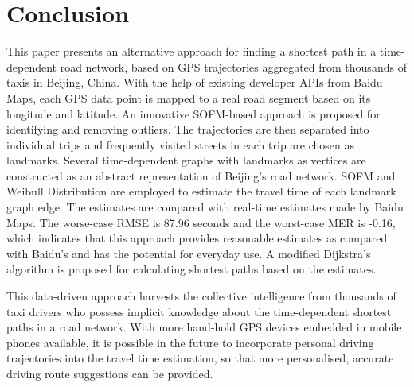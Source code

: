 \chapter{Conclusion}\label{Chap:6}

This paper presents an alternative approach for finding a shortest path in a time-dependent road network, based on GPS trajectories aggregated from thousands of taxis in Beijing, China. With the help of existing developer APIs from Baidu Maps, each GPS data point is mapped to a real road segment based on its longitude and lati\-tude. An innovative SOFM-based approach is proposed for identifying and removing outliers. The trajectories are then separated into individual trips and frequently vi\-sited streets in each trip are chosen as landmarks. Several time-dependent graphs with landmarks as vertices are constructed as an abstract representation of Beijing's road network. SOFM and Weibull Distribution are employed to estimate the travel time of each landmark graph edge. The estimates are compared with real-time estimates made by Baidu Maps. The worse-case RMSE is 87.96 seconds and the worst-case MER is -0.16, which indicates that this approach provides reasonable estimates as compared with Baidu's and has the potential for everyday use. A modified Dijkstra's algorithm is proposed for calculating shortest paths based on the estimates. 

This data-driven approach harvests the collective intelligence from thousands of taxi drivers who possess implicit knowledge about the time-dependent shortest paths in a road network. With more hand-hold GPS devices embedded in mobile phones available, it is possible in the future to incorporate personal driving trajectories into the travel time estimation, so that more personalised, accurate driving route suggestions can be provided. 